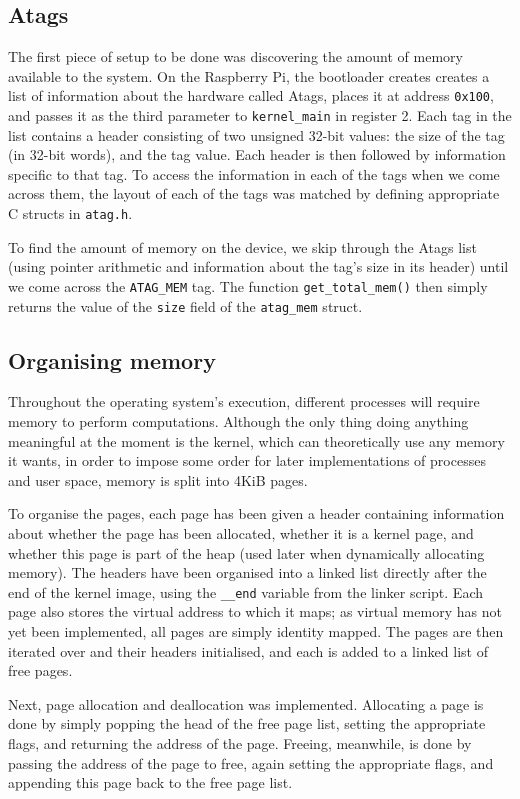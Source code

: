 \documentclass[10pt,a4paper]{article}
\newcommand{\code}[1]{\texttt{#1}}
\begin{document}
\subsection*{Atags}
The first piece of setup to be done was discovering the amount of memory
available to the system. On the Raspberry Pi, the bootloader creates creates a
list of information about the hardware called Atags, places it at address
\code{0x100}, and passes it as the third parameter to \code{kernel\_main} in
register 2. Each tag in the list contains a header consisting of two unsigned
32-bit values: the size of the tag (in 32-bit words), and the tag value. Each
header is then followed by information specific to that tag. To access the
information in each of the tags when we come across them, the layout of each of
the tags \cite{atags} was matched by defining appropriate C structs in
\code{atag.h}.

To find the amount of memory on the device, we skip through the Atags list
(using pointer arithmetic and information about the tag's size in its header)
until we come across the \code{ATAG\_MEM} tag. The function
\code{get\_total\_mem()} then simply returns the value of the \code{size} field
of the \code{atag\_mem} struct.

\subsection*{Organising memory}
Throughout the operating system's execution, different processes will require
memory to perform computations. Although the only thing doing anything
meaningful at the moment is the kernel, which can theoretically use any memory
it wants, in order to impose some order for later implementations of processes
and user space, memory is split into 4KiB pages.

To organise the pages, each page has been given a header containing information
about whether the page has been allocated, whether it is a kernel page, and
whether this page is part of the heap (used later when dynamically allocating
memory). The headers have been organised into a linked list directly after
the end of the kernel image, using the \code{\_\_end} variable from the linker
script. Each page also stores the virtual address to which it maps; as virtual
memory has not yet been implemented, all pages are simply identity mapped. The
pages are then iterated over and their headers initialised, and each is added to
a linked list of free pages.

Next, page allocation and deallocation was implemented. Allocating a page is
done by simply popping the head of the free page list, setting the appropriate
flags, and returning the address of the page. Freeing, meanwhile, is done by
passing the address of the page to free, again setting the appropriate flags,
and appending this page back to the free page list.
\end{document}
